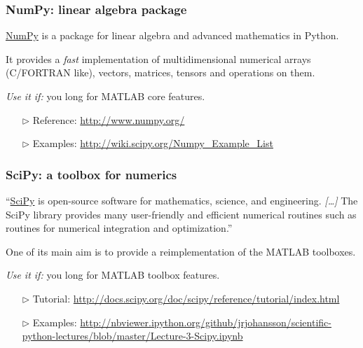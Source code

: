 \documentclass[english,serif,mathserif,xcolor=pdftex,dvipsnames,table]{beamer}
\begin{document}
\begin{frame}[fragile]
  \frametitle{NumPy: linear algebra package}

  \href{http://www.numpy.org/}{NumPy} is a package for linear algebra
  and advanced mathematics in Python.

  \+ It provides a \emph{fast} implementation of multidimensional
  numerical arrays (C/FORTRAN like), vectors, matrices, tensors and
  operations on them.

  \+ \emph{Use it if:} you long for MATLAB core features.

  \+
  \begin{itemize}
  \item[$\triangleright$] Reference: {\footnotesize\url{http://www.numpy.org/}}
  \item[$\triangleright$] Examples: {\footnotesize\url{http://wiki.scipy.org/Numpy_Example_List}}
  \end{itemize}
\end{frame}


\begin{frame}[fragile]
  \frametitle{SciPy: a toolbox for numerics}

  ``\href{http://www.scipy.org}{SciPy} is open-source software for
  mathematics, science, and engineering. \emph{[\ldots]} The SciPy
  library provides many user-friendly and efficient numerical routines
  such as routines for numerical integration and optimization.''

  \+ One of its main aim is to provide a reimplementation of the
  MATLAB toolboxes.

  \+ \emph{Use it if:} you long for MATLAB toolbox features.

  \+
  \begin{itemize}
  \item[$\triangleright$] Tutorial: {\scriptsize\url{http://docs.scipy.org/doc/scipy/reference/tutorial/index.html}}
  \item[$\triangleright$] Examples: {\scriptsize\url{http://nbviewer.ipython.org/github/jrjohansson/scientific-python-lectures/blob/master/Lecture-3-Scipy.ipynb}}
  \end{itemize}
\end{frame}
\end{document}
